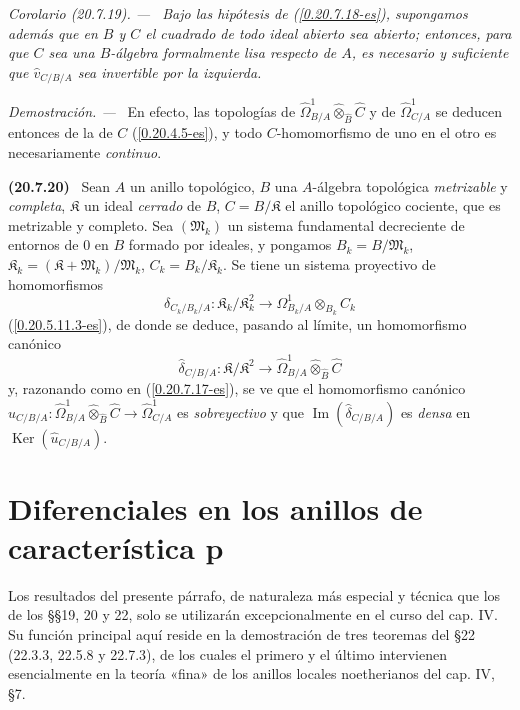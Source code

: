 \documentclass[10pt,oneside]{book}
\makeatletter
\newcommand{\sref}[1]{\textup{(\ref{#1})}}
\newcommand{\setmanualcurrentlabel}[1]{\def\@currentlabel{#1}}
\newcommand{\oldpage}[2][]{%
  \setcounter{footnote}{0}%
  \marginpar{\scriptsize\textbf{#1}~|~#2}\ignorespaces}
\newenvironment{env}[1][]{\setmanualcurrentlabel{#1}\par\medskip\noindent\textbf{(#1)}\ }{\par}
\newenvironment{corollary}[1][]{%
  \setmanualcurrentlabel{#1}\par\medskip\noindent\itshape Corolario (#1). ---\ }{\par}
\newenvironment{proof}{%
  \par\medskip\noindent\textit{Demostración. ---\ }}{\par}
\makeatother
\begin{document}
\begin{corollary}[20.7.19]
\label{0.20.7.19-es}
Bajo las hipótesis de \textup{\sref{0.20.7.18-es}}, supongamos además que en $B$ y
$C$ el cuadrado de todo ideal abierto sea abierto; entonces, para que $C$ sea
una $B$-álgebra formalmente lisa respecto de $A$, es necesario y suficiente
que $\widehat v_{C/B/A}$ sea invertible por la izquierda.
\end{corollary}

\begin{proof}
En efecto, las topologías de
$\widehat{\Omega}^1_{B/A}\widehat\otimes_{\widehat B}\widehat C$ y de
$\widehat{\Omega}^1_{C/A}$ se deducen entonces de la de $C$
\sref{0.20.4.5-es}, y todo $C$-homomorfismo de uno en el otro es
necesariamente \emph{continuo}.
\end{proof}

\begin{env}[20.7.20]
\label{0.20.7.20-es}
Sean $A$ un anillo topológico, $B$ una $A$-álgebra topológica
\emph{metrizable} y \emph{completa}, $\mathfrak K$ un ideal \emph{cerrado} de $B$,
$C=B/\mathfrak K$ el anillo topológico cociente, que es metrizable y
completo. Sea $(\mathfrak{M}_k)$ un sistema fundamental decreciente de
entornos de $0$ en $B$ formado por ideales, y pongamos
$B_k=B/\mathfrak{M}_k$,
$\mathfrak K_k=(\mathfrak K+\mathfrak{M}_k)/\mathfrak{M}_k$,
$C_k=B_k/\mathfrak K_k$. Se tiene un sistema proyectivo de homomorfismos
\[
  \delta_{C_k/B_k/A}:\mathfrak K_k/\mathfrak K_k^2\to
  \Omega^1_{B_k/A}\otimes_{B_k}C_k
\]
\sref{0.20.5.11.3-es}, de donde se deduce, pasando al límite, un
homomorfismo canónico
\[
  \widehat\delta_{C/B/A}:\mathfrak K/\mathfrak K^2\to
  \widehat{\Omega}^1_{B/A}\widehat\otimes_{\widehat B}\widehat C
\]
y, razonando como en \sref{0.20.7.17-es}, se ve que el homomorfismo canónico
$\widehat u_{C/B/A}:\widehat{\Omega}^1_{B/A}
\widehat\otimes_{\widehat B}\widehat C\to\widehat{\Omega}^1_{C/A}$ es
\emph{sobreyectivo} y que $\operatorname{Im}(\widehat\delta_{C/B/A})$ es
\emph{densa} en $\operatorname{Ker}(\widehat u_{C/B/A})$.
\end{env}

\section{Diferenciales en los anillos de característica p}
Los resultados del presente párrafo, de naturaleza más especial y técnica que
los de los §§19, 20 y 22, solo se utilizarán excepcionalmente en el curso del
cap. IV. Su función principal aquí reside en la demostración de tres teoremas del §22
(22.3.3, 22.5.8 y 22.7.3), de los cuales el primero y el último intervienen
esencialmente en la teoría «fina» de los anillos locales noetherianos del
cap. IV, §7.
\oldpage[0\textsubscript{IV-1}]{154}
\end{document}
